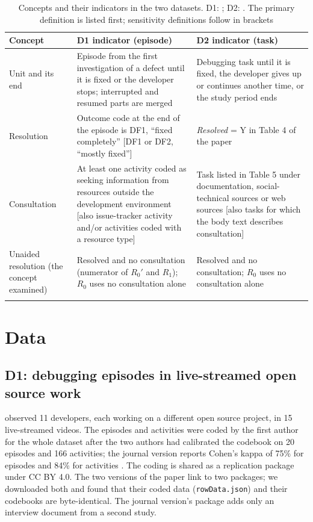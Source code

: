 \documentclass[pdflatex,sn-basic]{sn-jnl}
\newcommand{\Rz}{\ensuremath{R_0}}
\newcommand{\Rzp}{\ensuremath{R_0'}}
\newcommand{\Ro}{\ensuremath{R_1}}
\begin{document}
\begin{table}[t]
\caption{Concepts and their indicators in the two datasets. D1: \citet{alaboudi2021,alaboudi2023}; D2: \citet{li2026}. The primary definition is listed first; sensitivity definitions follow in brackets}\label{tab:constructs}
\footnotesize
\begin{tabular*}{\textwidth}{@{\extracolsep\fill}p{}p{}p{}}
\toprule
Concept & D1 indicator (episode) & D2 indicator (task) \\
\midrule
Unit and its end & Episode from the first investigation of a defect until it is fixed or the developer stops; interrupted and resumed parts are merged & Debugging task until it is fixed, the developer gives up or continues another time, or the study period ends \\
Resolution & Outcome code at the end of the episode is DF1, ``fixed completely'' [DF1 or DF2, ``mostly fixed''] & \emph{Resolved} = Y in Table 4 of the paper \\
Consultation & At least one activity coded as seeking information from resources outside the development environment [also issue-tracker activity and/or activities coded with a resource type] & Task listed in Table 5 under documentation, social-technical sources or web sources [also tasks for which the body text describes consultation] \\
Unaided resolution (the concept examined) & Resolved and no consultation (numerator of \Rzp{} and \Ro); \Rz{} uses no consultation alone & Resolved and no consultation; \Rz{} uses no consultation alone \\
\botrule
\end{tabular*}
\end{table}

\section{Data}\label{sec:data}

\subsection{D1: debugging episodes in live-streamed open source work}

\citet{alaboudi2021,alaboudi2023} observed 11 developers, each working on a different open source project, in 15 live-streamed videos. The episodes and activities were coded by the first author for the whole dataset after the two authors had calibrated the codebook on 20 episodes and 166 activities; the journal version reports Cohen's kappa of 75\% for episodes and 84\% for activities \citep{alaboudi2023}. The coding is shared as a replication package under CC BY 4.0. The two versions of the paper link to two packages; we downloaded both and found that their coded data (\texttt{rowData.json}) and their codebooks are byte-identical. The journal version's package adds only an interview document from a second study.
\end{document}
